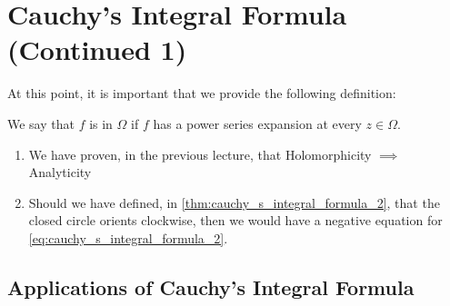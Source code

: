 \documentclass[notoc,notitlepage]{tufte-book}
\begin{document}
\section{Cauchy's Integral Formula (Continued 1)} %
\label{sec:cauchy_s_integral_formula_continued_1}

At this point, it is important that we provide the following definition:

\begin{defn}\label{defn:analytic_functions}
  We say that $f$ is  in $\Omega$ if $f$ has a power series expansion at every $z \in \Omega$.
\end{defn}

\begin{remark}
	\begin{enumerate}
		\item We have proven, in the previous lecture, that Holomorphicity $\implies$ Analyticity
		\item Should we have defined, in \cref{thm:cauchy_s_integral_formula_2}, that the closed circle orients clockwise, then we would have a negative equation for \cref{eq:cauchy_s_integral_formula_2}.
	\end{enumerate}
\end{remark}

\subsection{Applications of Cauchy's Integral Formula} %
\label{sub:applications_of_cauchy_s_integral_formula}
\end{document}
